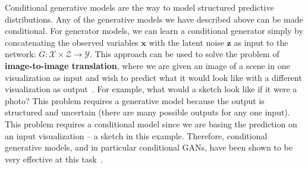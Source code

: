 Conditional generative models are the way to model structured predictive distributions. Any of the generative models we have described above can be made conditional. For generator models, we can learn a conditional generator simply by concatenating the observed variables $\mathbf{x}$ with the latent noise $\mathbf{z}$ as input to the network: $G: \mathcal{X} \times \mathcal{Z} \rightarrow \mathcal{Y}$. This approach can be used to solve the problem of \textbf{image-to-image translation}, where we are given an image of a scene in one visualization as input and wish to predict what it would look like with a different visualization as output~\cite{pix2pix2017}. For example, what would a sketch look like if it were a photo? This problem requires a generative model because the output is structured and uncertain (there are many possible outputs for any one input). This problem requires a conditional model since we are basing the prediction on an input visualization -- a sketch in this example. Therefore, conditional generative models, and in particular conditional GANs, have been shown to be very effective at this task~\cite{pix2pix2017}.





